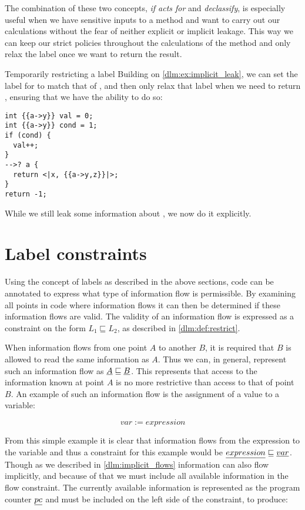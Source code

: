 The combination of these two concepts, \emph{if acts for} and \emph{declassify}, is especially useful when we have sensitive inputs to a method and want to carry out our calculations without the fear of neither explicit or implicit leakage.
This way we can keep our strict policies throughout the calculations of the method and only relax the label once we want to return the result.

\begin{example}{Temporarily restricting a label}
  Building on \cref{dlm:ex:implicit_leak}, we can set the label for  to match that of , and then only relax that label when we need to return , ensuring that we have the ability to do so:
  \begin{lstlisting}[style=dlmc]
int {{a->y}} val = 0;
int {{a->y}} cond = 1;
if (cond) {
  val++;
}
-->? a {
  return <|x, {{a->y,z}}|>;
}
return -1;
  \end{lstlisting}
  While we still leak some information about , we now do it explicitly.
\end{example}

\section{Label constraints}\label{dlm:constraints}
Using the concept of labels as described in the above sections, code can be annotated to express what type of information flow is permissible.
By examining all points in code where information flows it can then be determined if these information flows are valid.
The validity of an information flow is expressed as a constraint on the form $L_1 \sqsubseteq L_2$, as described in \cref{dlm:def:restrict}.

When information flows from one point $A$ to another $B$, it is required that $B$ is allowed to read the same information as $A$.
Thus we can, in general, represent such an information flow as $\underline{A} \sqsubseteq \underline{B}$.
This represents that access to the information known at point $A$ is no more restrictive than access to that of point $B$.
An example of such an information flow is the assignment of a value to a variable:

$$var := expression$$

From this simple example it is clear that information flows from the expression to the variable and thus a constraint for this example would be $\underline{expression} \sqsubseteq \underline{var}$.
Though as we described in \cref{dlm:implicit_flows} information can also flow implicitly, and because of that we must include all available information in the flow constraint.
The currently available information is represented as the program counter $\underline{pc}$ and must be included on the left side of the constraint, to produce:

